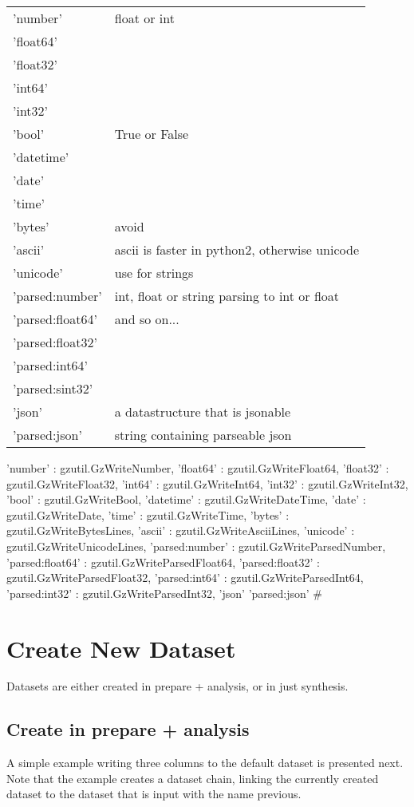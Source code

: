 \begin{tabular}{ll}
	'number'   &  float or int\\
	'float64'   &\\
	'float32'   &\\
	'int64'   & \\
	'int32'   &  \\
	'bool'   &  True or False\\
	'datetime'   &  \\
	'date'   &  \\
	'time'   &  \\
	'bytes'   &  avoid \\
	'ascii'   &  ascii is faster in python2, otherwise unicode\\
	'unicode'   &  use for strings\\
	'parsed:number'   & int, float or string parsing to int or float \\
	'parsed:float64'   &  and so on...\\
	'parsed:float32'   &  \\
	'parsed:int64'   &  \\
	'parsed:sint32'   &  \\
        'json'   &  a datastructure that is jsonable\\
        'parsed:json'   &  string containing parseable json\\

\end{tabular}
	'number'   : gzutil.GzWriteNumber,
	'float64'  : gzutil.GzWriteFloat64,
	'float32'  : gzutil.GzWriteFloat32,
	'int64'    : gzutil.GzWriteInt64,
	'int32'    : gzutil.GzWriteInt32,
	'bool'     : gzutil.GzWriteBool,
	'datetime' : gzutil.GzWriteDateTime,
	'date'     : gzutil.GzWriteDate,
	'time'     : gzutil.GzWriteTime,
	'bytes'    : gzutil.GzWriteBytesLines,
	'ascii'    : gzutil.GzWriteAsciiLines,
	'unicode'  : gzutil.GzWriteUnicodeLines,
	'parsed:number'   : gzutil.GzWriteParsedNumber,
	'parsed:float64'  : gzutil.GzWriteParsedFloat64,
	'parsed:float32'  : gzutil.GzWriteParsedFloat32,
	'parsed:int64'    : gzutil.GzWriteParsedInt64,
	'parsed:int32'    : gzutil.GzWriteParsedInt32,
        'json'
        'parsed:json' #


\newpage
\section{Create New Dataset}
Datasets are either created in prepare + analysis, or in just
synthesis.

\subsection{Create in prepare + analysis}
A simple example writing three columns to the default dataset is
presented next.  Note that the example creates a dataset chain,
linking the currently created dataset to the dataset that is input
with the name previous.

